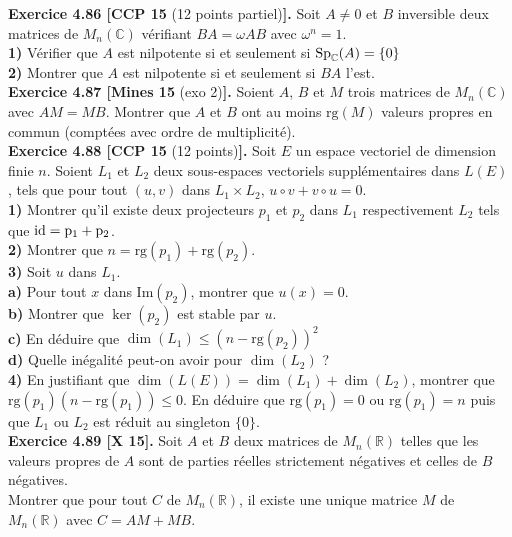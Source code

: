 \documentclass[a4paper,12pt,francais]{article}
\newcommand{\field}[1]{\mathbb{#1}}
\newcommand{\R}{\field{R}}
\newcommand{\C}{\field{C}}
\newcommand{\im}{\mbox{Im}}
\newcommand{\rg}{\mbox{rg}}
\begin{document}
\noindent
{\bf Exercice 4.86 [CCP 15} (12 points partiel){\bf ].}
Soit $A\neq 0$ et $B$ inversible deux matrices de $M_n(\C)$ vérifiant $BA=\omega AB$ avec $\omega^n=1$.\\
{\bf 1)} Vérifier que $A$ est nilpotente si et seulement si ${\rm Sp}_\C(A)=\{0\}$\\
{\bf 2)} Montrer que $A$ est nilpotente si et seulement si $BA$ l'est.\\

\noindent
{\bf Exercice 4.87 [Mines 15} (exo 2){\bf]. } %
Soient $A$, $B$ et $M$ trois matrices de $M_n(\C)$ avec $AM=MB$. Montrer que $A$ et $B$ ont au moins $\rg(M)$ valeurs propres en commun (comptées avec ordre de multiplicité).\\

\noindent
{\bf Exercice 4.88 [CCP 15 }(12 points){\bf ]. }%
Soit $E$ un espace vectoriel de dimension finie $n$. Soient $L_1$ et $L_2$ deux sous-espaces vectoriels supplémentaires dans $L(E)$, tels que pour tout $(u,v)$ dans $L_1 \times L_2$, $u \circ v+v\circ u=0$.\\
{\bf 1)} Montrer qu'il existe deux projecteurs $p_1$ et $p_2$ dans $L_1$ respectivement $L_2$ tels que $\rm{id} = p_1+p_2$.\\
{\bf 2)} Montrer que $n = \rg(p_1)+\rg(p_2)$.\\
{\bf 3)} Soit $u$ dans $L_1$.\\ 
\indent	
{\bf a)} Pour tout $x$ dans $\im(p_2)$, montrer que $u(x) = 0$.\\
\indent	
{\bf b)} Montrer que $\ker(p_2)$ est stable par $u$.\\
\indent	
{\bf c)} En déduire que $\dim(L_1) \leqslant (n-\rg(p_2))^2$\\
\indent	
{\bf d)} Quelle inégalité peut-on avoir pour $\dim(L_2)$ ?\\
{\bf 4)} En justifiant que $\dim(L(E)) = \dim(L_1) + \dim(L_2)$, montrer que $\rg(p_1)(n-\rg(p_1)) \leqslant 0$. En déduire que $\rg(p_1) = 0$ ou $\rg(p_1) = n$ puis que $L_1$ ou $L_2$ est réduit au singleton $\{0\}$.\\  
 
 \noindent
{\bf Exercice 4.89 [X 15]. }%
Soit $A$ et $B$ deux matrices de $M_n(\R)$ telles que les valeurs propres de $A$ sont de parties réelles strictement négatives et celles de $B$ négatives.\\
Montrer que pour tout $C$ de $M_n(\R)$, il existe une unique matrice $M$ de $M_n(\R)$ avec $C=AM+MB$.\\
 
\end{document}
